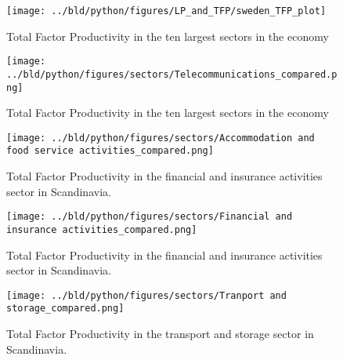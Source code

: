\documentclass[11pt, a4paper, leqno]{article}
\begin{document}
\begin{figure}[H]

    \centering
    \texttt{[image: ../bld/python/figures/LP\_and\_TFP/sweden\_TFP\_plot]}

    \caption{Total Factor Productivity in the ten largest sectors in the economy}
    \label{fig:python-predictions}

\end{figure}


\begin{figure}[H]

    \centering
    \texttt{[image: ../bld/python/figures/sectors/Telecommunications\_compared.png]}

    \caption{Total Factor Productivity in the ten largest sectors in the economy}
    \label{fig:python-predictions}

\end{figure}

\begin{figure}[H]

    \centering
    \texttt{[image: ../bld/python/figures/sectors/Accommodation and food service activities\_compared.png]}

    \caption{Total Factor Productivity in the financial and insurance activities sector in Scandinavia.}
    \label{fig:python-predictions}

\end{figure}

\begin{figure}[H]

    \centering
    \texttt{[image: ../bld/python/figures/sectors/Financial and insurance activities\_compared.png]}

    \caption{Total Factor Productivity in the financial and insurance activities sector in Scandinavia.}
    \label{fig:python-predictions}

\end{figure}

\begin{figure}[H]

    \centering
    \texttt{[image: ../bld/python/figures/sectors/Tranport and storage\_compared.png]}

    \caption{Total Factor Productivity in the transport and storage sector in Scandinavia.}
    \label{fig:python-predictions}

\end{figure}
\end{document}
